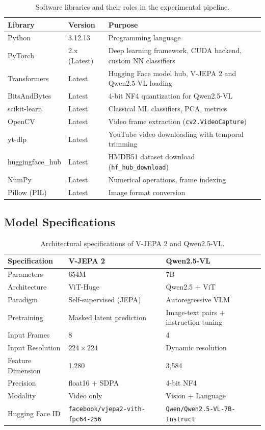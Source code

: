 \begin{table}[H]
\centering
\caption{Software libraries and their roles in the experimental pipeline.}
\label{tab:software_stack}
\begin{tabularx}{\textwidth}{l l X}
\toprule
\textbf{Library} & \textbf{Version} & \textbf{Purpose} \\
\midrule
Python & 3.12.13 & Programming language \\
PyTorch & 2.x (Latest) & Deep learning framework, CUDA backend, custom NN classifiers \\
Transformers & Latest & Hugging Face model hub, V-JEPA 2 and Qwen2.5-VL loading \\
BitsAndBytes & Latest & 4-bit NF4 quantization for Qwen2.5-VL \\
scikit-learn & Latest & Classical ML classifiers, PCA, metrics \\
OpenCV & Latest & Video frame extraction (\texttt{cv2.VideoCapture}) \\
yt-dlp & Latest & YouTube video downloading with temporal trimming \\
huggingface\_hub & Latest & HMDB51 dataset download (\texttt{hf\_hub\_download}) \\
NumPy & Latest & Numerical operations, frame indexing \\
Pillow (PIL) & Latest & Image format conversion \\
\bottomrule
\end{tabularx}
\end{table}

\subsection{Model Specifications}

\begin{table}[H]
\centering
\caption{Architectural specifications of V-JEPA 2 and Qwen2.5-VL.}
\label{tab:model_specs}
\begin{tabularx}{\textwidth}{l X X}
\toprule
\textbf{Specification} & \textbf{V-JEPA 2} & \textbf{Qwen2.5-VL} \\
\midrule
Parameters & 654M & 7B \\
Architecture & ViT-Huge & Qwen2.5 + ViT \\
Paradigm & Self-supervised (JEPA) & Autoregressive VLM \\
Pretraining & Masked latent prediction & Image-text pairs + instruction tuning \\
Input Frames & 8 & 4 \\
Input Resolution & $224 \times 224$ & Dynamic resolution \\
Feature Dimension & 1,280 & 3,584 \\
Precision & float16 + SDPA & 4-bit NF4 \\
Modality & Video only & Vision + Language \\
Hugging Face ID & \nolinkurl{facebook/vjepa2-vith-fpc64-256} & \nolinkurl{Qwen/Qwen2.5-VL-7B-Instruct} \\
\bottomrule
\end{tabularx}
\end{table}

